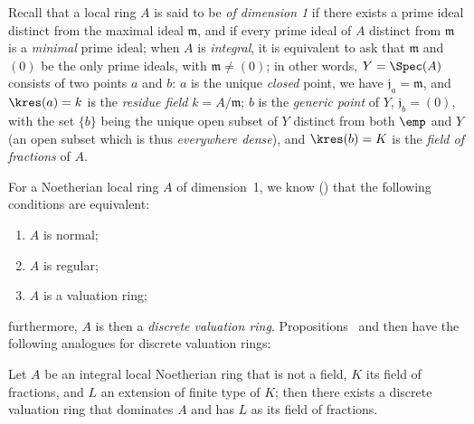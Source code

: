 \begin{env}[7.1.5]
\label{II.7.1.5}
Recall that a local ring $A$ is said to be \emph{of dimension 1} if there exists a prime ideal distinct from the maximal ideal $\mathfrak{m}$, and if every prime ideal of $A$ distinct from $\mathfrak{m}$ is a \emph{minimal} prime ideal;
when $A$ is \emph{integral}, it is equivalent to ask that $\mathfrak{m}$ and $(0)$ be the only prime ideals, with $\mathfrak{m}\neq(0)$;
in other words, $Y=\Spec(A)$ consists of two
points $a$ and $b$: $a$ is the unique \emph{closed} point, we have $\mathfrak{j}_a=\mathfrak{m}$, and $\kres(a)=k$ is the \emph{residue field} $k=A/\mathfrak{m}$;
$b$ is the \emph{generic point} of $Y$, $\mathfrak{j}_b=(0)$, with the set $\{b\}$ being the unique open subset of $Y$ distinct from both $\emp$ and $Y$ (an open subset which is thus \emph{everywhere dense}), and $\kres(b)=K$ is the \emph{field of fractions} of $A$.
\end{env}

\begin{env}[7.1.6]
\label{II.7.1.6}
For a Noetherian local ring $A$ of dimension~1, we know (\cite[pp.~2-08 and 17-01]{I-1}) that the following conditions are equivalent:
\begin{enumerate}
    \item[\rm{(a)}] $A$ is normal;
    \item[\rm{(b)}] $A$ is regular;
    \item[\rm{(c)}] $A$ is a valuation ring;
\end{enumerate}
furthermore, $A$ is then a \emph{discrete valuation ring}.
Propositions~ and  then have the following analogues for discrete valuation rings:
\end{env}

\begin{proposition}[7.1.7]
\label{II.7.1.7}
Let $A$ be an integral local Noetherian ring that is not a field, $K$ its field of fractions, and $L$ an extension of finite type of $K$;
then there exists a discrete valuation ring that dominates $A$ and has $L$ as its field of fractions.
\end{proposition}

